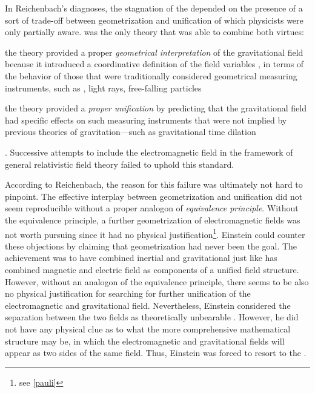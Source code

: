 \documentclass[final]{article}
\begin{document}
In Reichenbach's diagnoses, the stagnation of the \uftp depended on the presence of a sort of trade-off between geometrization and unification of which physicists were only partially aware. \Gr was the only theory that was able to combine both virtues: \begin{inparaenum}[(1)] \item the theory provided a proper \emph{geometrical interpretation} of the gravitational field because it introduced a coordinative definition of the field variables \gmn, in terms of the behavior of those that were traditionally considered geometrical measuring instruments, such as \rac, light rays, free-falling particles \item the theory provided a \emph{proper unification} by predicting that the gravitational field had specific effects on such measuring instruments that were not implied by previous theories of gravitation---such as gravitational time dilation \end{inparaenum} \citep[350]{Reichenbach1928}. Successive attempts to include the electromagnetic field in the framework of general relativistic field theory failed to uphold this standard. 


According to Reichenbach, the reason for this failure was ultimately not hard to pinpoint. The effective interplay between geometrization and unification did not seem reproducible without a proper analogon of \emph{equivalence principle}. Without the equivalence principle, a further geometrization of electromagnetic fields was not worth pursuing since it had no physical justification\footnote{see \cref{pauli}}. Einstein could counter these objections by claiming that geometrization had never been the goal. The achievement \gr was to have combined inertial and gravitational just like \sr has combined magnetic and electric field as components of a unified field structure. However, without an analogon of the equivalence principle, there seems to be also no physical justification for searching for further unification of the electromagnetic and gravitational field. Nevertheless, Einstein considered the separation between the two fields as theoretically unbearable \citep[24]{Einstein1930i}. However, he did not have any physical clue as to what the more comprehensive mathematical structure may be, in which the electromagnetic and gravitational fields will appear as two sides of the same field. Thus, Einstein was forced to resort to the .
\end{document}
